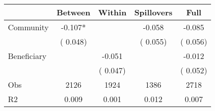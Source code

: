 
\begin{tabular}{l*{4}{c}}\hline&\multicolumn{1}{c}{Between}&\multicolumn{1}{c}{Within}&\multicolumn{1}{c}{Spillovers}&\multicolumn{1}{c}{Full}\\ \hline
 Community             &             -0.107*      &                                               &       -0.058 &        -0.085                            \\ 
                               &        (       0.048)           &                                       &       (       0.055)     &      (       0.056)                                           \\ 
 Beneficiary   &                                               &       -0.051    &                                &            -0.012                            \\ 
                               &                                               & (       0.047)                  &                                        &      (       0.052)                                           \\ 
\hline                                                                                                                                                                                                                                            
 Obs                   &               2126               &       1924                       &       1386                &              2718                                               \\ 
 R2                    &                      0.009              &              0.001                      &              0.012               &                     0.007                                              \\ 
\hline \end{tabular}                                                                                                                                                                                                              
